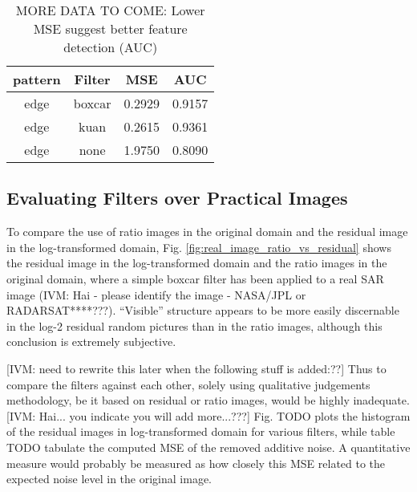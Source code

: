 \documentclass[journal]{IEEEtran}
\begin{document}
\begin{table}
\centering

\begin{tabular}{c|c|c|c}
pattern  & Filter                     & MSE    & AUC       \\%
\hline
edge	& boxcar	& 0.2929	& 0.9157 \\
edge	& kuan	  & 0.2615	& 0.9361 \\
edge	& none	  & 1.9750	& 0.8090
\end{tabular}

\caption{MORE DATA TO COME: Lower MSE suggest better feature detection (AUC) }
\label{tab:mse_auc_in_log_domain}
\end{table}

\subsection{Evaluating Filters over Practical Images}

To compare the use of ratio images in the original domain and the residual image in the log-transformed domain, Fig. \ref{fig:real_image_ratio_vs_residual} shows the residual image in the log-transformed domain and the ratio images in the original domain, where a simple boxcar filter has been applied to a real SAR image (IVM: Hai - please identify the image - NASA/JPL or RADARSAT****???).
``Visible'' structure appears to be more easily discernable in the log-2 residual random pictures than in the ratio images, although this conclusion is extremely subjective.

[IVM: need to rewrite this later when the following stuff is added:??] Thus to compare the filters against each other, solely using qualitative judgements methodology, be it based on residual or ratio images, would be highly inadequate.
[IVM: Hai... you indicate you will add more...???] Fig. TODO plots the histogram of the residual images in log-transformed domain for various filters, while table TODO tabulate the computed MSE of the removed additive noise.
A quantitative measure would probably be measured as how closely this MSE related to the expected noise level in the original image. 

\end{document}
